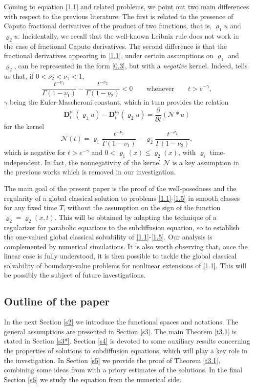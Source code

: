 \documentclass[reqno]{amsart}
\theoremstyle{definition}
\numberwithin{equation}{section}
\begin{document}
Coming to equation \eqref{1.1} and related problems, we point out two main differences with respect to the previous literature. The first is related to the presence of Caputo fractional derivatives of the product of two functions, that is, $\varrho_{1}u$ and $\varrho_{2} u$.
Incidentally, we recall that the well-known Leibniz rule does not work in the case of fractional Caputo derivatives.
The second difference is that the fractional derivatives appearing
in \eqref{1.1}, under certain assumptions on $\varrho_1$ and $\varrho_{2}$,
can be represented in the form \eqref{0.3}, but with a \emph{negative} kernel.
Indeed, \cite[Lemma 4]{JK} tells us that, if $0<\nu_2<\nu_1<1$,
$$\frac{t^{-\nu_1}}{\Gamma(1-\nu_1)}-\frac{t^{-\nu_{2}}}{\Gamma(1-\nu_{2})}<0
\qquad\text{whenever}\qquad t>e^{-\gamma},$$
$\gamma$ being the Euler-Mascheroni constant,
which in turn provides the relation
\[
\mathbf{D}_{t}^{\nu_1}(\varrho_{1}u)-\mathbf{D}_{t}^{\nu_2}(\varrho_{2} u)=\frac{\partial}{\partial t}(\mathcal{N}* u)
\]
for the kernel
$$\mathcal{N}(t)=\varrho_{1}\frac{t^{-\nu_{1}}}{\Gamma(1-\nu_{1})}-\varrho_2\frac{t^{-\nu_{2}}}{\Gamma(1-\nu_{2})},$$
which is negative for $t>e^{-\gamma}$ and
$0<\varrho_1(x)\leq\varrho_2(x)$, with $\varrho_i$ time-independent.
In fact, the nonnegativity of the kernel $\mathcal{N}$ is a key assumption in the previous works which is removed in our investigation.

The main goal of the present paper is the proof of the well-posedness and the regularity of a global classical solution to problems \eqref{1.1}-\eqref{1.5} in smooth classes for any fixed time $T$, without the assumption on the sign of the function $\varrho_2=\varrho_2(x,t)$.
This will be obtained by adapting
the technique of a regularizer for parabolic equations \cite{LSU}
to the subdiffusion equation, so to establish the one-valued
global classical solvability of \eqref{1.1}-\eqref{1.5}.
Our analysis is complemented by numerical simulations.
It is also worth observing that, once the
linear case is fully understood, it is then possible to tackle the
global classical solvability of boundary-value problems for
nonlinear extensions of \eqref{1.1}. This will be possibly the
subject of future investigations.

\subsection*{Outline of the paper}
In the next Section \ref{s2} we introduce the functional spaces and notations.
The general assumptions
are presented in Section \ref{s3}. The main Theorem \ref{t3.1}
is stated in Section \ref{s3*}.
Section \ref{s4} is devoted to
some auxiliary results concerning the properties of solutions to
subdiffusion equations, which will play a key role in the
investigation. In Section \ref{s5} we provide the
proof of Theorem \ref{t3.1}, combining some ideas
from \cite{LSU} with a priory estimates of the solutions.
In the final Section \ref{s6} we study the equation from the numerical side.
\end{document}
